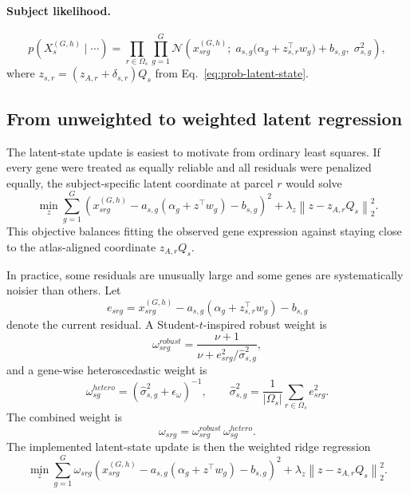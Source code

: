 \documentclass[11pt]{article}
\numberwithin{equation}{section}
\begin{document}
\paragraph{Subject likelihood.}
\[
  p(X_s^{(G,h)}\mid \cdots)
  = \prod_{r\in\Omega_s}\prod_{g=1}^G
    \mathcal{N}\!\left(x_{srg}^{(G,h)};\;
    a_{s,g}\bigl(\alpha_g + z_{s,r}^\top w_g\bigr) + b_{s,g},\;
    \sigma_{s,g}^2\right),
\]
where $z_{s,r} = (z_{A,r}+\delta_{s,r})Q_s$ from Eq.~\eqref{eq:prob-latent-state}.

\subsection{From unweighted to weighted latent regression}
The latent-state update is easiest to motivate from ordinary least squares.  If every
gene were treated as equally reliable and all residuals were penalized equally, the
subject-specific latent coordinate at parcel $r$ would solve
\begin{equation}
  \label{eq:prob-unweighted-latent-update}
  \min_{z}
  \sum_{g=1}^{G}
  \left(
  x_{srg}^{(G,h)} -
  a_{s,g}\left(\alpha_g + z^\top w_g\right) -
  b_{s,g}
  \right)^2
  +
  \lambda_z \left\| z - z_{A,r}Q_s \right\|_2^2.
\end{equation}
This objective balances fitting the observed gene expression against staying close to
the atlas-aligned coordinate $z_{A,r}Q_s$.

In practice, some residuals are unusually large and some genes are systematically
noisier than others.  Let
\[
  e_{srg}
  = x_{srg}^{(G,h)}
  - a_{s,g}\left(\alpha_g + z_{s,r}^\top w_g\right)
  - b_{s,g}
\]
denote the current residual.  A Student-$t$-inspired robust weight is
\begin{equation}
  \label{eq:prob-robust-weight}
  \omega_{srg}^{robust}
  =
  \frac{\nu + 1}{\nu + e_{srg}^2 / \hat{\sigma}_{s,g}^2},
\end{equation}
and a gene-wise heteroscedastic weight is
\begin{equation}
  \label{eq:prob-hetero-weight}
  \omega_{sg}^{hetero}
  =
  \left(\hat{\sigma}_{s,g}^2 + \epsilon_\omega\right)^{-1},
  \qquad
  \hat{\sigma}_{s,g}^2
  =
  \frac{1}{|\Omega_s|}
  \sum_{r\in\Omega_s}
  e_{srg}^2.
\end{equation}
The combined weight is
\begin{equation}
  \label{eq:prob-total-weight}
  \omega_{srg} = \omega_{srg}^{robust}\,\omega_{sg}^{hetero}.
\end{equation}
The implemented latent-state update is then the weighted ridge regression
\begin{equation}
  \label{eq:prob-latent-update}
  \min_{z}
  \sum_{g=1}^{G}
  \omega_{srg}
  \left(
  x_{srg}^{(G,h)} -
  a_{s,g}\left(\alpha_g + z^\top w_g\right) -
  b_{s,g}
  \right)^2
  +
  \lambda_z \left\| z - z_{A,r}Q_s \right\|_2^2.
\end{equation}
\end{document}

